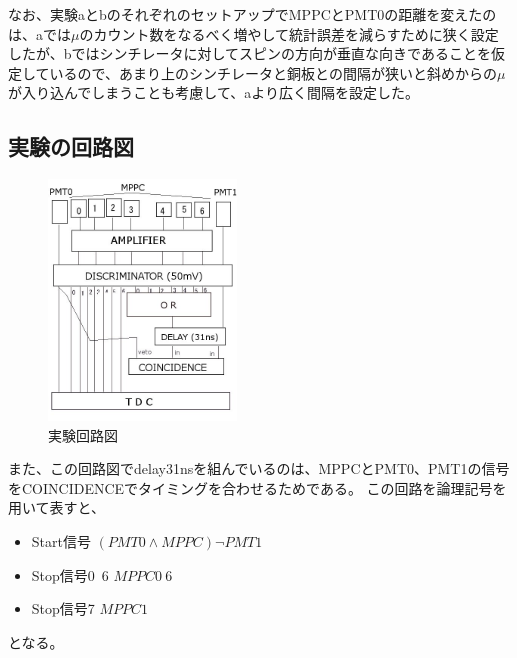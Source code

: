 なお、実験aとbのそれぞれのセットアップでMPPCとPMT0の距離を変えたのは、aでは$\mu$のカウント数をなるべく増やして統計誤差を減らすために狭く設定したが、bではシンチレータに対してスピンの方向が垂直な向きであることを仮定しているので、あまり上のシンチレータと銅板との間隔が狭いと斜めからの$\mu$が入り込んでしまうことも考慮して、aより広く間隔を設定した。
\subsection{実験の回路図}
\begin{figure}[htbm]
  \includegraphics[width=5cm, bb=0 0 640 500]{kairo2.jpg}
  \caption{実験回路図}
\end{figure}
また、この回路図でdelay31nsを組んでいるのは、MPPCとPMT0、PMT1の信号をCOINCIDENCEでタイミングを合わせるためである。
この回路を論理記号を用いて表すと、
\begin{itemize}
  \item Start信号 $(PMT0 \land MPPC)\lnot PMT1 $
  \item Stop信号0~6 $ MPPC 0~6 $
  \item Stop信号7 $ MPPC1 $
\end{itemize}
となる。

